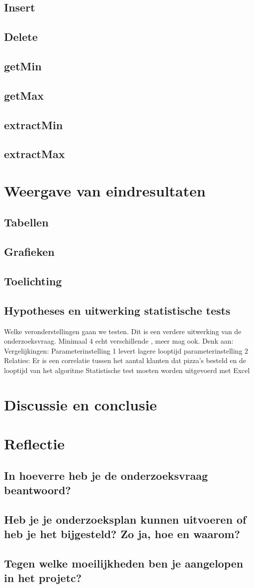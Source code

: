 \documentclass{article}
\begin{document}
\subsection{Insert}
\subsection{Delete}
\subsection{getMin}
\subsection{getMax}
\subsection{extractMin}
\subsection{extractMax}
\section{Weergave van eindresultaten}
\subsection{Tabellen}
\subsection{Grafieken}
\subsection{Toelichting}
\subsection{Hypotheses en uitwerking statistische tests}
 Welke veronderstellingen gaan we testen. Dit is een verdere uitwerking van de onderzoeksvraag. Minimaal 4 echt verschillende , meer mag ook. Denk aan:
Vergelijkingen: Parameterinstelling 1 levert lagere looptijd parameterinstelling 2 Relaties: Er is een correlatie tussen het aantal klanten dat pizza's besteld en de looptijd van het algoritme
Statistische test moeten worden uitgevoerd met Excel
\section{Discussie en conclusie}
\section{Reflectie}
\subsection{In hoeverre heb je de onderzoeksvraag beantwoord?}
\subsection{Heb je je onderzoeksplan kunnen uitvoeren of heb je het bijgesteld? Zo ja, hoe en waarom?}
\subsection{Tegen welke moeilijkheden ben je aangelopen in het projetc?}
\end{document}
